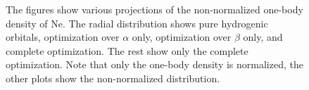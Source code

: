 \documentclass[aps,prc,twocolumn,floatfix]{revtex4}
\begin{document}
\begin{figure}[ht]
\caption[Optional caption for list of figures]{The figures show various projections of the non-normalized one-body density of Ne. The radial distribution shows pure hydrogenic orbitals, optimization over $\alpha$ only, optimization over $\beta$ only, and complete optimization. The rest show only the complete optimization. Note that only the one-body density is normalized, the other plots show the non-normalized distribution.}
\label{fig:8}
\end{figure}
\end{document}
